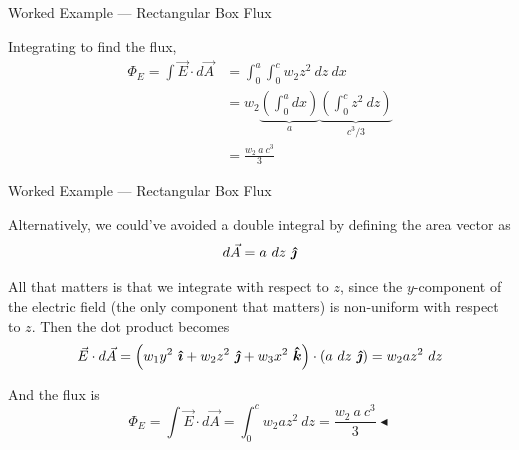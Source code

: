 \documentclass{beamer}
\begin{document}
\begin{frame}{Worked Example --- Rectangular Box Flux}

Integrating to find the flux,
\begin{align*}
    \Phi_E = \int \vec{E} \cdot d\vec{A} &= \int_0^a \int_0^c w_2 z^2\ dz\ dx \\
    &= w_2 \underbrace{\left( \int_0^a dx \right)}_{a} \underbrace{\left( \int_0^c z^2\ dz \right)}_{c^3/3} \\
    &= \frac{w_2\ a\ c^3}{3}
\end{align*}

\end{frame}

\begin{frame}{Worked Example --- Rectangular Box Flux}

Alternatively, we could've avoided a double integral by defining the area vector as
\begin{equation*}
    d\vec{A} = a\ dz\ \jhat
\end{equation*}

All that matters is that we integrate with respect to $z$, since the $y$-component of the electric field (the only component that matters) is non-uniform with respect to $z$. Then the dot product becomes
\begin{equation*}
    \vec{E} \cdot d\vec{A} = \left( w_1 y^2\ \bm{\hat{\imath}} + w_2 z^2\ \bm{\hat{\jmath}} + w_3 x^2\ \bm{\hat{k}} \right) \cdot \left( a\ dz\ \bm{\hat{\jmath}} \right) = w_2 a z^2\ dz
\end{equation*}

And the flux is
\begin{equation*}
    \Phi_E = \int \vec{E} \cdot d\vec{A} = \int_0^c w_2 a z^2\ dz = \boxed{\frac{w_2\ a\ c^3}{3}} \blacktriangleleft
\end{equation*}

\end{frame}
\end{document}
